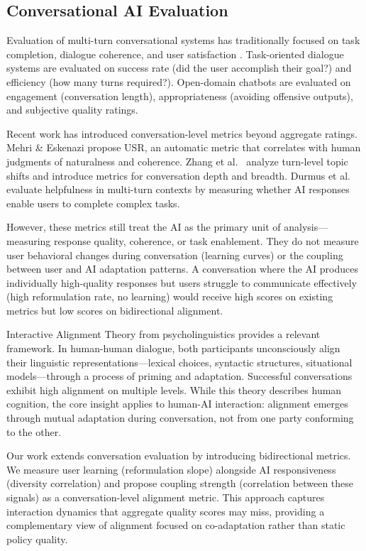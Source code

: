 \subsection{Conversational AI Evaluation}

Evaluation of multi-turn conversational systems has traditionally focused on task completion, dialogue coherence, and user satisfaction \cite{walker1997paradise}. Task-oriented dialogue systems are evaluated on success rate (did the user accomplish their goal?) and efficiency (how many turns required?). Open-domain chatbots are evaluated on engagement (conversation length), appropriateness (avoiding offensive outputs), and subjective quality ratings.

Recent work has introduced conversation-level metrics beyond aggregate ratings. Mehri \& Eskenazi \cite{mehri2020usr} propose USR, an automatic metric that correlates with human judgments of naturalness and coherence. Zhang et al.\ \cite{zhang2021dialogpt} analyze turn-level topic shifts and introduce metrics for conversation depth and breadth. Durmus et al.\ \cite{durmus2023measuring} evaluate helpfulness in multi-turn contexts by measuring whether AI responses enable users to complete complex tasks.

However, these metrics still treat the AI as the primary unit of analysis---measuring response quality, coherence, or task enablement. They do not measure user behavioral changes during conversation (learning curves) or the coupling between user and AI adaptation patterns. A conversation where the AI produces individually high-quality responses but users struggle to communicate effectively (high reformulation rate, no learning) would receive high scores on existing metrics but low scores on bidirectional alignment.

Interactive Alignment Theory from psycholinguistics \cite{pickering2004toward} provides a relevant framework. In human-human dialogue, both participants unconsciously align their linguistic representations---lexical choices, syntactic structures, situational models---through a process of priming and adaptation. Successful conversations exhibit high alignment on multiple levels. While this theory describes human cognition, the core insight applies to human-AI interaction: alignment emerges through mutual adaptation during conversation, not from one party conforming to the other.

Our work extends conversation evaluation by introducing bidirectional metrics. We measure user learning (reformulation slope) alongside AI responsiveness (diversity correlation) and propose coupling strength (correlation between these signals) as a conversation-level alignment metric. This approach captures interaction dynamics that aggregate quality scores may miss, providing a complementary view of alignment focused on co-adaptation rather than static policy quality.

